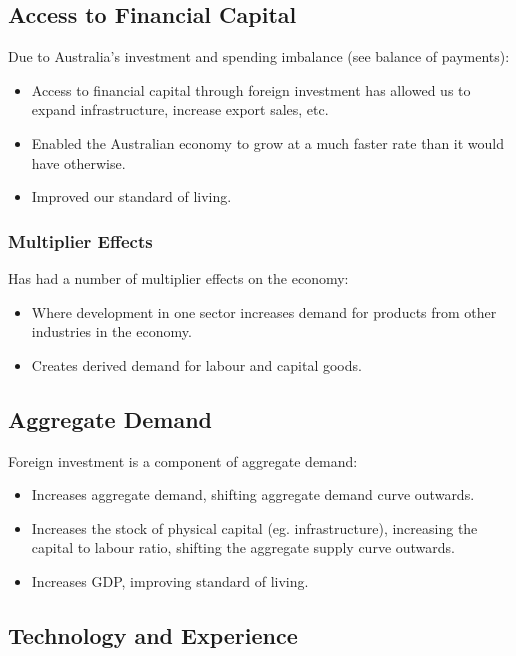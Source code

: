 \documentclass[a4paper,11pt]{article}
\begin{document}
\subsection{Access to Financial Capital}

Due to Australia's investment and spending imbalance (see balance of payments):

\begin{itemize}
\item Access to financial capital through foreign investment has allowed us to
	expand infrastructure, increase export sales, etc.
\item Enabled the Australian economy to grow at a much faster rate than it
	would have otherwise.
\item Improved our standard of living.
\end{itemize}


\subsubsection{Multiplier Effects}

Has had a number of multiplier effects on the economy:

\begin{itemize}
\item Where development in one sector increases demand for products from other
	industries in the economy.
\item Creates derived demand for labour and capital goods.
\end{itemize}


\subsection{Aggregate Demand}

Foreign investment is a component of aggregate demand:

\begin{itemize}
\item Increases aggregate demand, shifting aggregate demand curve outwards.
\item Increases the stock of physical capital (eg. infrastructure), increasing
	the capital to labour ratio, shifting the aggregate supply curve outwards.
\item Increases GDP, improving standard of living.
\end{itemize}


\subsection{Technology and Experience}
\end{document}
